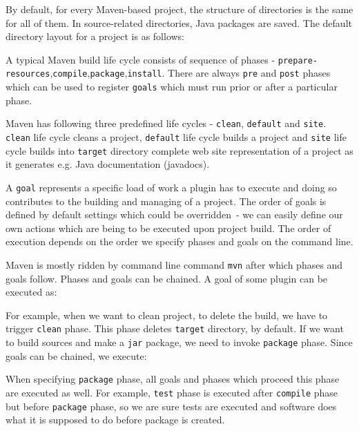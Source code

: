 \documentclass[12pt,final,oneside]{fithesis}
\begin{document}
By default, for every Maven-based project, the structure of directories is the same for all of them. 
In source-related directories, Java packages are saved. The default directory layout for a project is as follows:



A typical Maven build life cycle consists of sequence of phases - \texttt{prepare-resources},\texttt{compile},\texttt{package},\texttt{install}. There are always \texttt{pre} and \texttt{post} phases which can be used to register \texttt{goals} which must run prior or after a particular phase.

Maven has following three predefined life cycles - \texttt{clean}, \texttt{default} and \texttt{site}. \texttt{clean} life cycle cleans a project, \texttt{default} life cycle builds a project and \texttt{site} life cycle builds into \texttt{target} directory complete web site representation of a project as it generates e.g. Java documentation (javadocs).

A \texttt{goal} represents a specific load of work a plugin has to execute and doing so contributes to the building and managing of a project. The order of goals is defined by default settings which could be overridden~- we can easily define our own actions which are being to be executed upon project build. The order of execution depends on the order we specify phases and goals on the command line.

Maven is mostly ridden by command line command \texttt{mvn} after which phases and goals follow. Phases and 
goals can be chained. A goal of some plugin can be executed as:



For example, when we want to clean project, to delete the build, we have to trigger \texttt{clean} phase. This 
phase deletes \texttt{target} directory, by default. If we want to build sources and make a \texttt{jar} package, we need to invoke \texttt{package} phase. Since goals can be chained, we execute:



When specifying \texttt{package} phase, all goals and phases which proceed this phase are executed as well. For example, \texttt{test} phase is executed after \texttt{compile} phase but before \texttt{package} phase, so we are sure tests are executed and software does what it is supposed to do before package is created.
\end{document}
